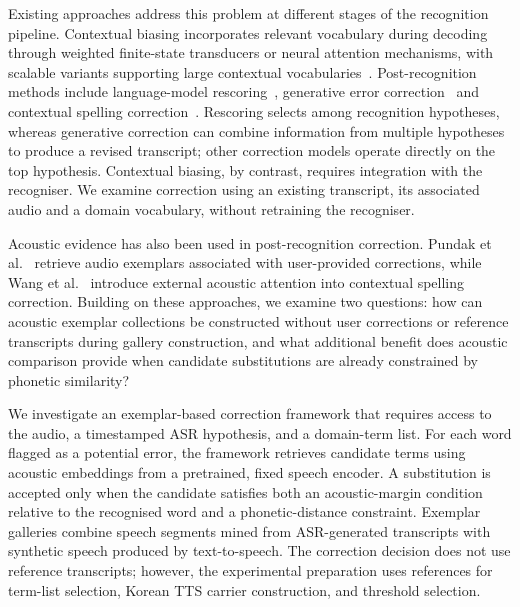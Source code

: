 \documentclass{article}
\begin{document}
Existing approaches address this problem at different stages of the recognition pipeline. Contextual biasing incorporates relevant vocabulary during decoding
through weighted finite-state transducers or neural attention mechanisms, with scalable variants supporting large contextual
vocabularies~\cite{aleksic2015bringing,hall2015composition,pundak2018deep,jain2020contextual,chang2021context,le2021deep,sun2021tree}. Post-recognition
methods include language-model rescoring~\cite{shin2019effective}, generative
error correction~\cite{chen2023hyporadise,ma2023llm} and contextual spelling
correction~\cite{guo2019spelling,wang2022towards}. Rescoring selects among
recognition hypotheses, whereas generative correction can combine information
from multiple hypotheses to produce a revised transcript; other correction
models operate directly on the top hypothesis. Contextual biasing, by contrast,
requires integration with the recogniser. We examine correction using an
existing transcript, its associated audio and a domain vocabulary, without
retraining the recogniser.

Acoustic evidence has also been used in post-recognition correction. Pundak et al.~\cite{pundak2022onthefly} retrieve audio exemplars associated with user-provided corrections, while Wang et al.~\cite{wang2023acoustics} introduce external acoustic attention into contextual spelling correction. Building on these approaches, we examine two questions: how can acoustic exemplar collections be constructed without user corrections or reference transcripts during gallery construction, and what additional benefit does acoustic comparison provide when candidate substitutions are already constrained by phonetic similarity?

We investigate an exemplar-based correction framework that requires access to the audio, a timestamped ASR hypothesis, and a domain-term list. For each word flagged as a potential error, the framework retrieves candidate terms using acoustic embeddings from a pretrained, fixed speech encoder. A substitution is accepted only when the candidate satisfies both an acoustic-margin condition relative to the recognised word and a phonetic-distance constraint. Exemplar galleries combine speech segments mined from ASR-generated transcripts with synthetic speech produced by text-to-speech. The correction decision does not use reference transcripts; however, the experimental preparation uses references for term-list selection, Korean TTS carrier construction, and threshold selection.
\end{document}
